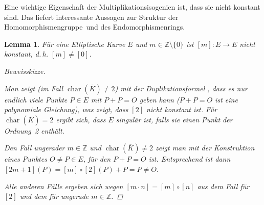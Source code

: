 \documentclass[english, german, parskip=half]{scrartcl}
\newtheorem{Lemma}[Satz]{Lemma}
\theoremstyle{definition}
\theoremstyle{remark}
\newcommand*{\Z}{\mathds{Z}}
\newcommand*{\algK}{\ensuremath{\overline K}} %
\renewcommand{\O}{O}
\DeclareMathOperator{\Char}{char} %
\begin{document}
Eine wichtige Eigenschaft der Multiplikationsisogenien ist, dass sie
nicht konstant sind. Das liefert interessante Aussagen zur Struktur
der Homomorphismengruppe~und des Endomorphismenrings.
\begin{Lemma}\label{additionnichtkonstant}
  Für eine Elliptische Kurve $E$ und $m\in\Z\setminus\{0\}$
  ist $[m]\colon E\to E$ nicht konstant, d.\,h. $[m]\neq[0]$.
  \begin{proof}[Beweisskizze]
    \cite[siehe][Proposition 4.2 (a)]{silverman}
    
    Man zeigt (im Fall $\Char(\algK)\neq2$) mit der Duplikationsformel
    \cite[Group Law Algorithm III.2.3(d)]{silverman},
    dass es nur endlich viele Punkte $P\in E$ mit $P+P=\O$ geben kann
    ($P+P=\O$ ist eine polynomiale Gleichung),
    was zeigt, dass $[2]$ nicht konstant ist.
    Für $\Char(\algK)=2$ ergibt sich, dass $E$ singulär ist, falls sie
    einen Punkt der Ordnung~2 enthält.

    Den Fall ungerader $m\in\Z$ und $\Char(\algK)\neq2$ zeigt man mit
    der Konstruktion eines Punktes $\O\neq P\in E$, für den $P+P=\O$
    ist. Entsprechend ist dann $[2m+1](P)=[m]\circ[2](P)+P=P\neq \O$.
    
    Alle anderen Fälle ergeben sich wegen 
    $[m\cdot n]=[m]\circ[n]$ aus dem Fall für $[2]$ und dem für ungerade
    $m\in\Z$.
  \end{proof}
\end{Lemma}
\end{document}
